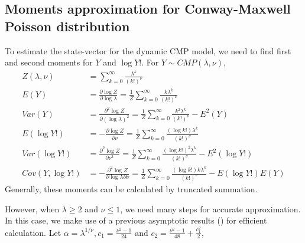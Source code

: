 \documentclass[]{article}
\begin{document}
\begin{appendices}
		\section{Moments approximation for Conway-Maxwell Poisson distribution}\label{appB}
		To estimate the state-vector for the dynamic CMP model, we need to find first and second moments for $Y$ and $\log Y!$. For $Y\sim CMP(\lambda, \nu)$,
		\begin{align}
			Z(\lambda, \nu) &= \sum_{k=0}^{\infty}\frac{\lambda^k}{(k!)^\nu}\\
			E(Y) &= \frac{\partial\log Z}{\partial \log\lambda} = \frac{1}{Z}\sum_{k=0}^{\infty}\frac{k\lambda^k}{(k!)^\nu} \nonumber\\
			Var(Y) &= \frac{\partial^2\log Z}{\partial(\log \lambda)^2} = \frac{1}{Z}\sum_{k=0}^{\infty}\frac{k^2\lambda^k}{(k!)^\nu} - E^2(Y) \nonumber\\
			E(\log Y!) &= -\frac{\partial\log Z}{\partial\nu} = \frac{1}{Z}\sum_{k=0}^{\infty}\frac{(\log k!)\lambda^k}{(k!)^\nu} \nonumber\\
			Var(\log Y!) &= \frac{\partial^2\log Z}{\partial \nu^2} = \frac{1}{Z}\sum_{k=0}^{\infty}\frac{(\log k!)^2\lambda^k}{(k!)^\nu} - E^2(\log Y!) \nonumber\\
			Cov(Y, \log Y!) &= -\frac{\partial^2\log Z}{\partial \log\lambda\partial\nu} = \frac{1}{Z}\sum_{k=0}^{\infty}\frac{(\log k!) k\lambda^k}{(k!)^\nu} - E(\log Y!)E(Y) \nonumber
		\end{align}
		Generally, these moments can be calculated by truncated summation.
		
		However, when $\lambda \geq 2$ and $\nu \leq 1$, we need many steps for accurate approximation. In this case, we make use of a previous asymptotic results (\cite{Chatla2018,Gaunt2019}) for efficient calculation. Let $\alpha = \lambda^{1/\nu}, c_1 = \frac{\nu^2-1}{24}$ and $c_2 = \frac{\nu^2 - 1}{48} + \frac{c_1^2}{2}$,
		

\end{appendices}
\end{document}
